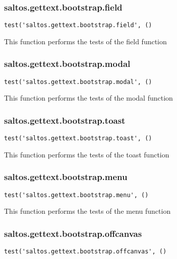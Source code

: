 \documentclass[a4paper]{article}
\begin{document}
\hypertarget{toc622}{}
\subsubsection{saltos.gettext.bootstrap.field}

\begin{lstlisting}
test('saltos.gettext.bootstrap.field', ()
\end{lstlisting}

This function performs the tests of the field function

\hypertarget{toc623}{}
\subsubsection{saltos.gettext.bootstrap.modal}

\begin{lstlisting}
test('saltos.gettext.bootstrap.modal', ()
\end{lstlisting}

This function performs the tests of the modal function

\hypertarget{toc624}{}
\subsubsection{saltos.gettext.bootstrap.toast}

\begin{lstlisting}
test('saltos.gettext.bootstrap.toast', ()
\end{lstlisting}

This function performs the tests of the toast function

\hypertarget{toc625}{}
\subsubsection{saltos.gettext.bootstrap.menu}

\begin{lstlisting}
test('saltos.gettext.bootstrap.menu', ()
\end{lstlisting}

This function performs the tests of the menu function

\hypertarget{toc626}{}
\subsubsection{saltos.gettext.bootstrap.offcanvas}

\begin{lstlisting}
test('saltos.gettext.bootstrap.offcanvas', ()
\end{lstlisting}
\end{document}
